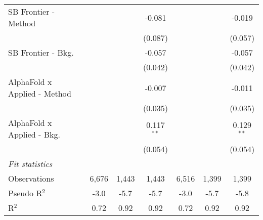 \begin{tabular}{lcccccc}
   SB Frontier - Method         &                &               & -0.081         &                &              & -0.019\\   
                                &                &               & (0.087)        &                &              & (0.057)\\   
   SB Frontier - Bkg.           &                &               & -0.057         &                &              & -0.057\\   
                                &                &               & (0.042)        &                &              & (0.042)\\   
   AlphaFold x Applied - Method &                &               & -0.007         &                &              & -0.011\\   
                                &                &               & (0.035)        &                &              & (0.035)\\   
   AlphaFold x Applied - Bkg.   &                &               & 0.117$^{**}$   &                &              & 0.129$^{**}$\\   
                                &                &               & (0.054)        &                &              & (0.054)\\   
   \midrule
   \emph{Fit statistics}\\
   Observations                 & 6,676          & 1,443         & 1,443          & 6,516          & 1,399        & 1,399\\  
   Pseudo R$^2$                 & -3.0           & -5.7          & -5.7           & -3.0           & -5.7         & -5.8\\  
   R$^2$                        & 0.72           & 0.92          & 0.92           & 0.72           & 0.92         & 0.92\\  
   

\end{tabular}

